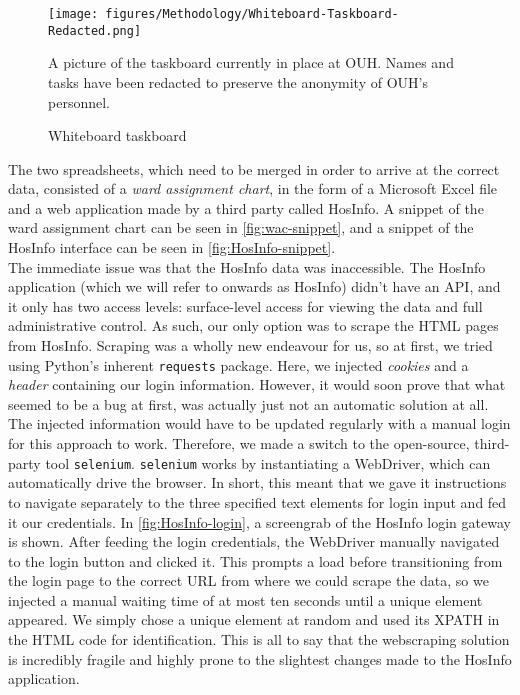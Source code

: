 \begin{figure}[H]
    \centering
    \texttt{[image: figures/Methodology/Whiteboard-Taskboard-Redacted.png]}
    \caption{Whiteboard taskboard}
    \small
    \raggedright 
    A picture of the taskboard currently in place at OUH. Names and tasks have been redacted to preserve the anonymity of OUH's personnel. 
    \label{fig:Whiteboard-Taskboard}
\end{figure}

The two spreadsheets, which need to be merged in order to arrive at the correct data, consisted of a \emph{ward assignment chart}, in the form of a Microsoft Excel file and a web application made by a third party called HosInfo. A snippet of the ward assignment chart can be seen in \autoref{fig:wac-snippet}, and a snippet of the HosInfo interface can be seen in \autoref{fig:HosInfo-snippet}.
\\
The immediate issue was that the HosInfo data was inaccessible. The HosInfo application (which we will refer to onwards as HosInfo) didn't have an API, and it only has two access levels: surface-level access for viewing the data and full administrative control. As such, our only option was to scrape the HTML pages from HosInfo. Scraping was a wholly new endeavour for us, so at first, we tried using Python's inherent \texttt{requests} package. Here, we injected \emph{cookies} and a \emph{header} containing our login information. However, it would soon prove that what seemed to be a bug at first, was actually just not an automatic solution at all. The injected information would have to be updated regularly with a manual login for this approach to work. Therefore, we made a switch to the open-source, third-party tool \texttt{selenium}. \texttt{selenium} works by instantiating a WebDriver, which can automatically drive the browser. In short, this meant that we gave it instructions to navigate separately to the three specified text elements for login input and fed it our credentials. In \autoref{fig:HosInfo-login}, a screengrab of the HosInfo login gateway is shown. After feeding the login credentials, the WebDriver manually navigated to the login button and clicked it. This prompts a load before transitioning from the login page to the correct URL from where we could scrape the data, so we injected a manual waiting time of at most ten seconds until a unique element appeared. We simply chose a unique element at random and used its XPATH in the HTML code for identification. This is all to say that the webscraping solution is incredibly fragile and highly prone to the slightest changes made to the HosInfo application.

